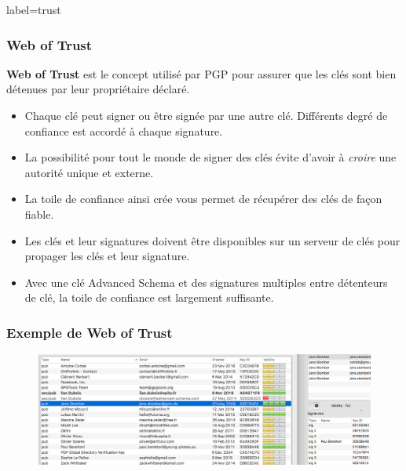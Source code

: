 \documentclass{beamer}
\begin{document}
        \begin{frame}{label=trust}
            \frametitle{Web of Trust}
            \textbf{Web of Trust} est le concept utilisé par PGP pour assurer que les clés sont bien détenues par leur propriétaire déclaré.
            \begin{center}
                \begin{itemize}
                    \item Chaque clé peut signer ou être signée par une autre clé. Différents degré de confiance est accordé à chaque signature.
                    \item La possibilité pour tout le monde de signer des clés évite d'avoir à \textit{croire} une autorité unique et externe.
                    \item La toile de confiance ainsi crée vous permet de récupérer des clés de façon fiable.
                    \item Les clés et leur signatures doivent être disponibles sur un serveur de clés pour propager les clés et leur signature.
                    \item Avec une clé Advanced Schema et des signatures multiples entre détenteurs de clé, la toile de confiance est largement suffisante.
                \end{itemize}
            \end{center}
        \end{frame}
        \begin{frame}
            \frametitle{Exemple de Web of Trust}
            \begin{center}
                \begin{figure}
                    \includegraphics[scale=0.27]{img/trust.png}
                \end{figure}
            \end{center}
        \end{frame}
\end{document}
